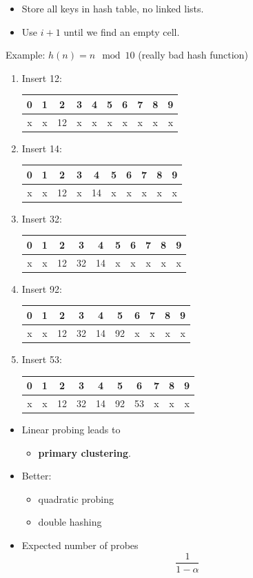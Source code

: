 \documentclass[landscape]{article}
\newcommand{\bi}{\begin{itemize}}
\newcommand{\ii}{\item}
\newcommand{\ei}{\end{itemize}}
\newcommand{\sect}[1]{\newpage{\textbf{#1}}}
\begin{document}
\sect{Open addressing}
\bi
\ii Store all keys in hash table, no linked lists.
\ii Use $i+1$ until we find an empty cell.
\ei
Example:  $h(n) = n\mod 10$  (really bad hash function)\\

\begin{minipage}{0.60\textwidth}
\begin{enumerate}
  \item Insert 12:
\begin{tabular}{|c|c|c|c|c|c|c|c|c|c|}\hline
  0&1&2&3&4&5&6&7&8&9\\\hline
{\sf x} &{\sf x} &12 &{\sf x} &{\sf x} &{\sf x} &{\sf x} &{\sf x} &{\sf x} &{\sf x} \\\hline
  \end{tabular}

  \item Insert 14:
\begin{tabular}{|c|c|c|c|c|c|c|c|c|c|}\hline
  0&1&2&3&4&5&6&7&8&9\\\hline
{\sf x} &{\sf x} &12 &{\sf x} &14 &{\sf x} &{\sf x} &{\sf x} &{\sf x} &{\sf x} \\\hline
  \end{tabular}

  \item Insert 32:
\begin{tabular}{|c|c|c|c|c|c|c|c|c|c|}\hline
  0&1&2&3&4&5&6&7&8&9\\\hline
{\sf x} &{\sf x} &12 &32 &14 &{\sf x} &{\sf x} &{\sf x} &{\sf x} &{\sf x} \\\hline
  \end{tabular}

  \item Insert 92:
\begin{tabular}{|c|c|c|c|c|c|c|c|c|c|}\hline
  0&1&2&3&4&5&6&7&8&9\\\hline
{\sf x} &{\sf x} &12 &32 &14 &92 &{\sf x} &{\sf x} &{\sf x} &{\sf x} \\\hline
  \end{tabular}

  \item Insert 53:
\begin{tabular}{|c|c|c|c|c|c|c|c|c|c|}\hline
  0&1&2&3&4&5&6&7&8&9\\\hline
{\sf x} &{\sf x} &12 &32 &14 &92 &53 &{\sf x} &{\sf x} &{\sf x} \\\hline
  \end{tabular}

\end{enumerate}
\end{minipage}
\begin{minipage}{0.40\textwidth}

\bi
\ii Linear probing leads to
\bi\ii\textbf{primary clustering}.\ei
\ii Better:
\bi \ii quadratic probing \ii double hashing \ei
\ii
Expected number of probes \[\frac{1}{1-\alpha}\]
\ei
\end{minipage}



\end{document}
